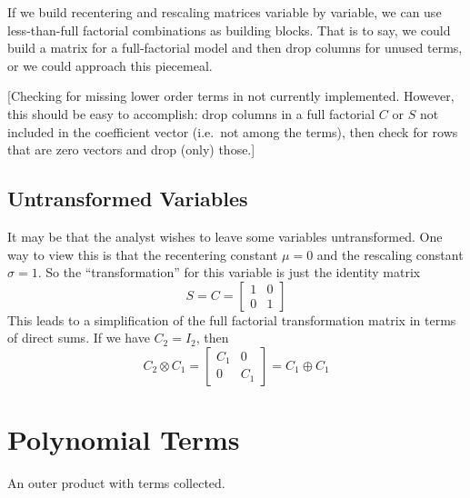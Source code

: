 \documentclass[]{article}
\begin{document}
If we build recentering and rescaling matrices variable by variable, we
can use less-than-full factorial combinations as building blocks. That
is to say, we could build a matrix for a full-factorial model and then
drop columns for unused terms, or we could approach this piecemeal.

{[}Checking for missing lower order terms in not currently implemented.
However, this should be easy to accomplish: drop columns in a full
factorial \(C\) or \(S\) not included in the coefficient vector
(i.e.~not among the terms), then check for rows that are zero vectors
and drop (only) those.{]}

\hypertarget{untransformed-variables}{%
\subsection{Untransformed Variables}\label{untransformed-variables}}

It may be that the analyst wishes to leave some variables untransformed.
One way to view this is that the recentering constant \(\mu=0\) and the
rescaling constant \(\sigma=1\). So the ``transformation'' for this
variable is just the identity matrix
\[S=C=\begin{bmatrix}1 & 0 \\ 0 &1 \end{bmatrix}\] This leads to a
simplification of the full factorial transformation matrix in terms of
direct sums. If we have \(C_2=I_2\), then
\[C_2 \otimes C_1 = \begin{bmatrix}C_1 &0 \\ 0 &C_1\end{bmatrix} = C_1 \oplus C_1 \]

\hypertarget{polynomial-terms}{%
\section{Polynomial Terms}\label{polynomial-terms}}

An outer product with terms collected.
\end{document}
